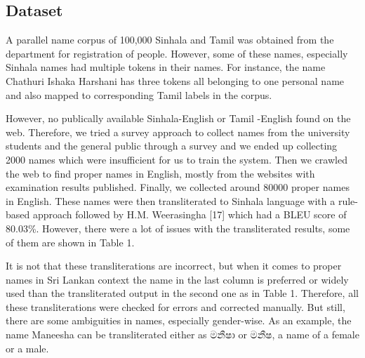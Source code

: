 \documentclass[10pt, a4paper, conference, compsocconf]{IEEEtran}
\begin{document}
\subsection{Dataset}

A parallel name corpus of 100,000 Sinhala and Tamil was obtained from the department for registration of people. However, some of these names, especially Sinhala names had multiple tokens in their names. For instance, the name Chathuri Ishaka Harshani has three tokens all belonging to one personal name and also mapped to corresponding Tamil labels in the corpus. 

However, no publically available Sinhala-English or Tamil -English found on the web. Therefore, we tried a survey approach to collect names from the university students and the general public through a survey and we ended up collecting 2000 names which were insufficient for us to train the system.
Then we crawled the web to find proper names in English, mostly from the websites with examination results published. Finally, we collected around 80000 proper names in English. These names were then transliterated to Sinhala language with a rule-based approach followed by H.M. Weerasingha [17] which had a BLEU score of 80.03\%. However, there were a lot of issues with the transliterated results, some of them are shown in Table 1.

 It is not that these transliterations are incorrect, but when it comes to proper names in Sri Lankan context the name in the last column is preferred or widely used than the transliterated output in the second one as in Table 1. Therefore, all these transliterations were checked for errors and corrected manually. But still, there are some ambiguities in names, especially gender-wise. As an example, the name Maneesha can be transliterated either as {\sifont මනීෂා} or {\sifont මනීෂ}, a name of a female or a male.
\end{document}
